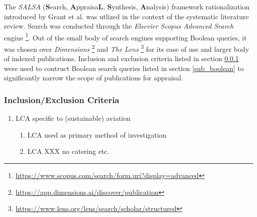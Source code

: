 \documentclass{article}
\begin{document}
        The \textit{SALSA} (\textbf{S}earch, \textbf{A}ppraisa\textbf{L}, \textbf{S}ynthesis, \textbf{A}nalysis) framework rationalization introduced by Grant et al. \cite{grant_typology_2009} was utlized in the context of the systematic literature review. Search was conducted through the \textit{Elsevier Scopus Advanced Search} engine \footnote{\url{https://www.scopus.com/search/form.uri?display=advanced}}. Out of the small body of search engines supporting Boolean queries, it was chosen over \textit{Dimensions} \footnote{\url{https://app.dimensions.ai/discover/publication}} and \textit{The Lens} \footnote{\url{https://www.lens.org/lens/search/scholar/structured}} for its ease of use and larger body of indexed publications. Inclusion and exclusion criteria listed in section \ref{subsub_inclusion_exclusion} were used to contruct Boolean search queries listed in section \ref{sub_boolean} to significantly narrow the scope of publications for appraisal. 
        
        \subsubsection{Inclusion/Exclusion Criteria}
        \label{subsub_inclusion_exclusion}
        
            \begin{enumerate}
                \item LCA specific to (sustainable) aviation
                \begin{enumerate}[label*=\arabic*]
                    \item LCA used as primary method of investigation
                    \item LCA XXX no catering etc.
                \end{enumerate}
            \end{enumerate}
        
\end{document}
